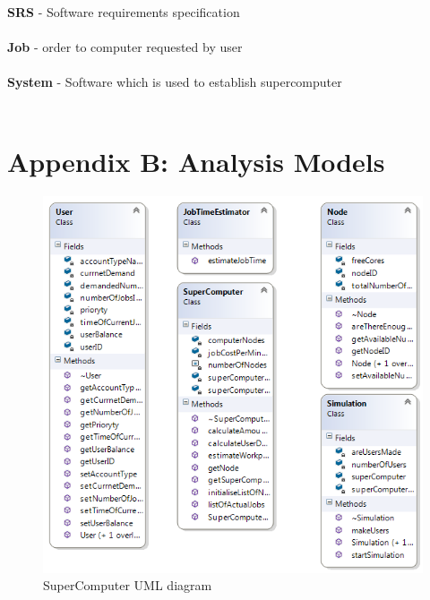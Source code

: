 \documentclass{scrreprt}
\begin{document}
\textbf{SRS }- Software requirements specification
\\
\\
\textbf{Job} - order to computer requested by user
\\
\\
\textbf{System} - Software which is used to establish supercomputer
\\
\\

\section{Appendix B: Analysis Models}

\begin{figure}[h!]
\centering
\includegraphics{ClassDiagram.png}
\caption{SuperComputer UML diagram}

\end{figure}
\end{document}
